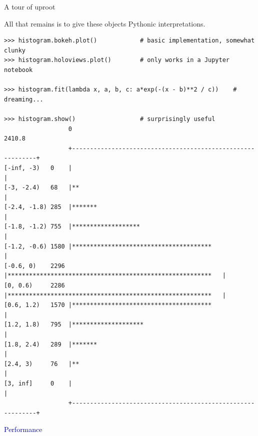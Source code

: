 \documentclass[aspectratio=169]{beamer}
\begin{document}
\begin{frame}[fragile]{A tour of uproot}
\vspace{0.4 cm}
\scriptsize

{\normalsize All that remains is to give these objects Pythonic interpretations.}

\begin{verbatim}
>>> histogram.bokeh.plot()            # basic implementation, somewhat clunky
>>> histogram.holoviews.plot()        # only works in a Jupyter notebook

>>> histogram.fit(lambda x, a, b, c: a*exp(-(x - b)**2 / c))    # dreaming...

>>> histogram.show()                  # surprisingly useful
                  0                                                       2410.8
                  +------------------------------------------------------------+
[-inf, -3)   0    |                                                            |
[-3, -2.4)   68   |**                                                          |
[-2.4, -1.8) 285  |*******                                                     |
[-1.8, -1.2) 755  |*******************                                         |
[-1.2, -0.6) 1580 |***************************************                     |
[-0.6, 0)    2296 |*********************************************************   |
[0, 0.6)     2286 |*********************************************************   |
[0.6, 1.2)   1570 |***************************************                     |
[1.2, 1.8)   795  |********************                                        |
[1.8, 2.4)   289  |*******                                                     |
[2.4, 3)     76   |**                                                          |
[3, inf]     0    |                                                            |
                  +------------------------------------------------------------+
\end{verbatim}
\end{frame}

\begin{frame}{}
\begin{center}
\Huge \textcolor{darkblue}{Performance}
\end{center}
\end{frame}
\end{document}
